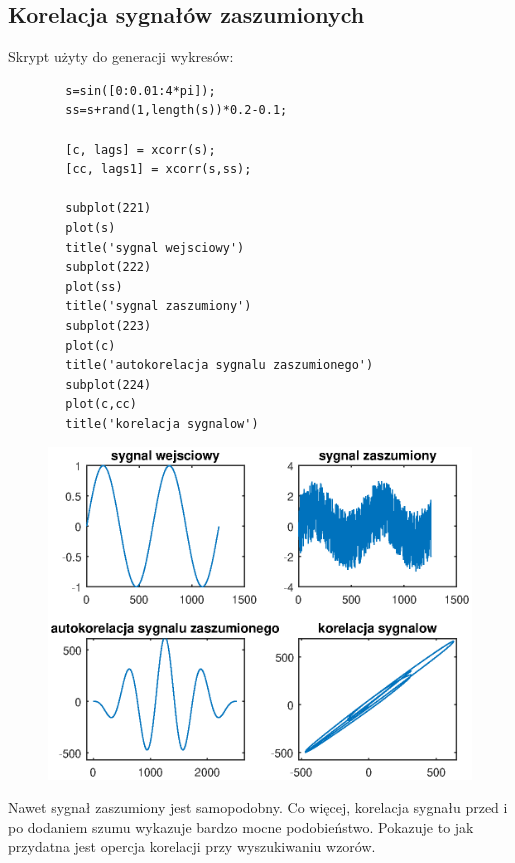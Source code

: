 \documentclass[12pt,titlepage]{report}
\begin{document}
\subsection{Korelacja sygnałów zaszumionych}
Skrypt użyty do generacji wykresów:
\begin{multicols}{3}
	{
		\tiny
		\begin{verbatim}
		s=sin([0:0.01:4*pi]);
		ss=s+rand(1,length(s))*0.2-0.1;
		
		[c, lags] = xcorr(s);
		[cc, lags1] = xcorr(s,ss);
		
		subplot(221)
		plot(s)
		title('sygnal wejsciowy')
		subplot(222)
		plot(ss)
		title('sygnal zaszumiony')
		subplot(223)
		plot(c)
		title('autokorelacja sygnalu zaszumionego')
		subplot(224)
		plot(c,cc)
		title('korelacja sygnalow')
		\end{verbatim}
	}
\end{multicols}
\begin{figure}[!h]
	\centering
	\includegraphics[scale=0.8]{../cw58_output}
	\caption{}
\end{figure}
Nawet sygnał zaszumiony jest samopodobny. Co więcej, korelacja sygnału przed i po dodaniem szumu wykazuje bardzo mocne podobieństwo. Pokazuje to jak przydatna jest opercja korelacji przy wyszukiwaniu wzorów.
	
	
\end{document}
